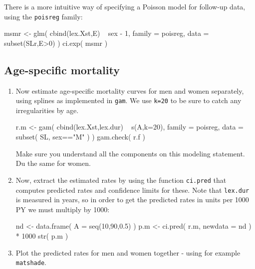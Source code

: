 \begin{enumerate}[resume]
There is a more intuitive way of specifying a Poisson model for
follow-up data, using the \texttt{poisreg} family:
\begin{Schunk}
\begin{Sinput}
 msmr <- glm( cbind(lex.Xst,E) ~ sex - 1,
              family = poisreg,
                data = subset(SLr,E>0) )
 ci.exp( msmr )
\end{Sinput}
\end{Schunk}
\end{enumerate}
\subsection*{Age-specific mortality}
\begin{enumerate}[resume]
\item Now estimate age-specific mortality curves for men and
  women separately, using splines as implemented in \texttt{gam}.
  We use \texttt{k=20} to be sure to catch any irregularities by age.
\begin{Schunk}
\begin{Sinput}
 r.m <- gam( cbind(lex.Xst,lex.dur) ~ s(A,k=20),
             family = poisreg,
               data = subset( SL, sex=="M" ) )
 gam.check( r.f )
\end{Sinput}
\end{Schunk}
Make sure you understand all the components on this modeling statement.
Du the same for women.
\item Now, extract the estimated rates by using the function
  \texttt{ci.pred} that computes predicted rates and confidence
  limits for these.
  Note that \texttt{lex.dur} is measured in years, so in order to
  get the predicted rates in units per 1000 PY we must multiply by 1000:
\begin{Schunk}
\begin{Sinput}
 nd <-  data.frame( A = seq(10,90,0.5) )
 p.m <- ci.pred( r.m, newdata = nd ) * 1000
 str( p.m )
\end{Sinput}
\end{Schunk}
\item Plot the predicted rates for men and women together - using for
  example \texttt{matshade}.
\begin{Schunk}
\end{Schunk}
\end{enumerate}
